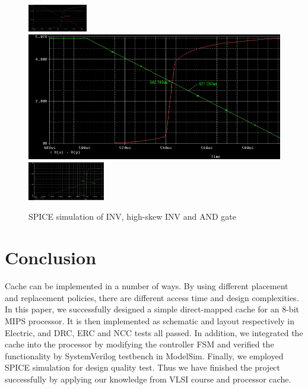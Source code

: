 \documentclass[conference]{IEEEtran}
\begin{document}
\begin{figure}[h!]
  \centering
    \includegraphics[width=0.23\textwidth]{inv} \includegraphics[scale=0.14]{hi} \includegraphics[width=0.3\textwidth]{and}
  \caption{SPICE simulation of INV, high-skew INV and AND gate}
  \label{fig:Spice}
\end{figure}

\section{Conclusion}\label{conclusion}
Cache can be implemented in a number of ways. By using different placement and replacement policies, there are different access time and design complexities. In this paper, we successfully designed a simple direct-mapped cache for an 8-bit MIPS processor. It is then implemented as schematic and layout respectively in Electric, and DRC, ERC and NCC tests all passed. In addition, we integrated the cache into the processor by modifying the controller FSM and verified the functionality by SystemVerilog testbench in ModelSim. Finally, we employed SPICE simulation for design quality test. Thus we have finished the project successfully by applying our knowledge from VLSI course and processor cache.





%
%
\end{document}
